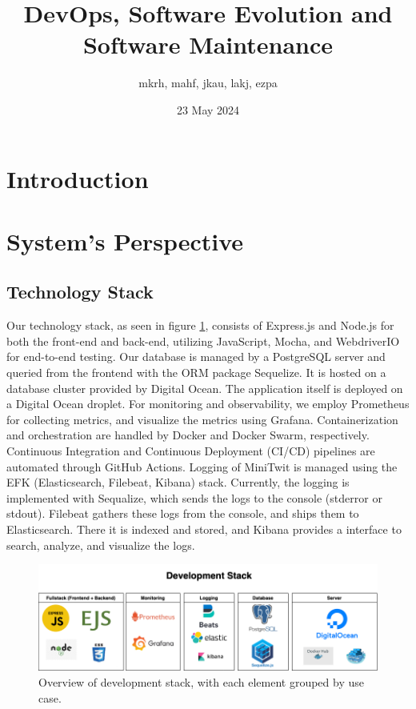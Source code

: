 \documentclass[11pt]{article}
\title{DevOps, Software Evolution and Software Maintenance}
\author{mkrh, mahf, jkau, lakj, ezpa}
\date{23 May 2024}
\begin{document}
\maketitle

\section{Introduction}


\section{System's Perspective}
\subsection{Technology Stack}
Our technology stack, as seen in figure \ref{fig:dev-stack}, consists of Express.js and Node.js for both the front-end and back-end, utilizing JavaScript, Mocha, and WebdriverIO for end-to-end testing. Our database is managed by a PostgreSQL server and queried from the frontend with the ORM package Sequelize. It is hosted on a database cluster provided by Digital Ocean. The application itself is deployed on a Digital Ocean droplet. For monitoring and observability, we employ Prometheus for collecting metrics, and visualize the metrics using Grafana. Containerization and orchestration are handled by Docker and Docker Swarm, respectively. Continuous Integration and Continuous Deployment (CI/CD) pipelines are automated through GitHub Actions. Logging of MiniTwit is managed using the EFK (Elasticsearch, Filebeat, Kibana) stack. Currently, the logging is implemented with Sequalize, which sends the logs to the console (stderror or stdout). Filebeat gathers these logs from the console, and ships them to Elasticsearch. There it is indexed and stored, and Kibana provides a interface to search, analyze, and visualize the logs.

\begin{figure}[!h]
    \centering
    \includegraphics[width=\textwidth]{images/techstack.png}
    \caption{Overview of development stack, with each element grouped by use case.}
    \label{fig:dev-stack}
\end{figure}
\end{document}
